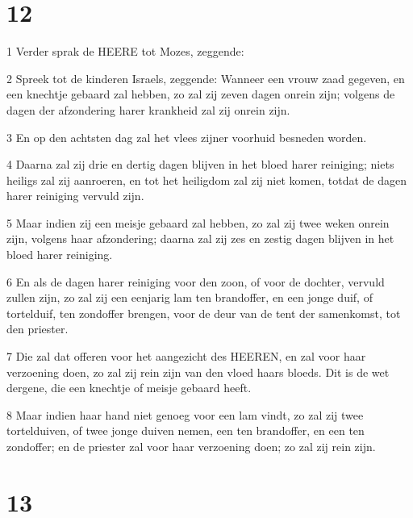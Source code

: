\chapter{12}

\par 1 Verder sprak de HEERE tot Mozes, zeggende:
\par 2 Spreek tot de kinderen Israels, zeggende: Wanneer een vrouw zaad gegeven, en een knechtje gebaard zal hebben, zo zal zij zeven dagen onrein zijn; volgens de dagen der afzondering harer krankheid zal zij onrein zijn.
\par 3 En op den achtsten dag zal het vlees zijner voorhuid besneden worden.
\par 4 Daarna zal zij drie en dertig dagen blijven in het bloed harer reiniging; niets heiligs zal zij aanroeren, en tot het heiligdom zal zij niet komen, totdat de dagen harer reiniging vervuld zijn.
\par 5 Maar indien zij een meisje gebaard zal hebben, zo zal zij twee weken onrein zijn, volgens haar afzondering; daarna zal zij zes en zestig dagen blijven in het bloed harer reiniging.
\par 6 En als de dagen harer reiniging voor den zoon, of voor de dochter, vervuld zullen zijn, zo zal zij een eenjarig lam ten brandoffer, en een jonge duif, of tortelduif, ten zondoffer brengen, voor de deur van de tent der samenkomst, tot den priester.
\par 7 Die zal dat offeren voor het aangezicht des HEEREN, en zal voor haar verzoening doen, zo zal zij rein zijn van den vloed haars bloeds. Dit is de wet dergene, die een knechtje of meisje gebaard heeft.
\par 8 Maar indien haar hand niet genoeg voor een lam vindt, zo zal zij twee tortelduiven, of twee jonge duiven nemen, een ten brandoffer, en een ten zondoffer; en de priester zal voor haar verzoening doen; zo zal zij rein zijn.

\chapter{13}

